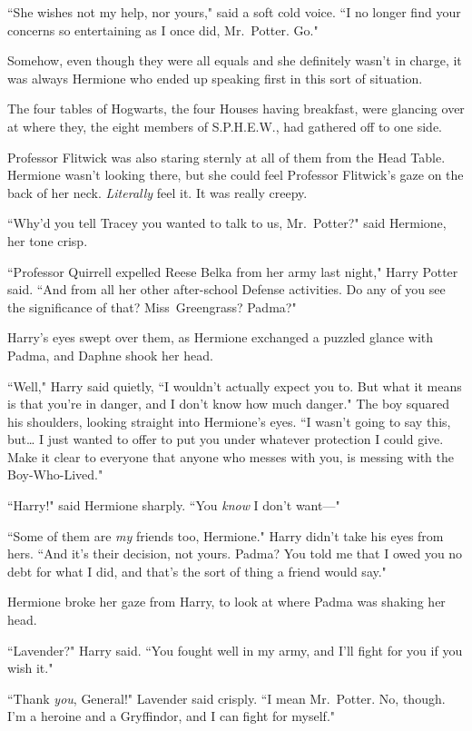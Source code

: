 ``She wishes not my help, nor yours," said a soft cold voice. ``I no longer find your concerns so entertaining as I once did, Mr.~Potter. Go."

\later

Somehow, even though they were all equals and she definitely wasn't in charge, it was always Hermione who ended up speaking first in this sort of situation.

The four tables of Hogwarts, the four Houses having breakfast, were glancing over at where they, the eight members of S.P.H.E.W., had gathered off to one side.

Professor Flitwick was also staring sternly at all of them from the Head Table. Hermione wasn't looking there, but she could feel Professor Flitwick's gaze on the back of her neck. \emph{Literally} feel it. It was really creepy.

``Why'd you tell Tracey you wanted to talk to us, Mr.~Potter?" said Hermione, her tone crisp.

``Professor Quirrell expelled Reese Belka from her army last night," Harry Potter said. ``And from all her other after-school Defense activities. Do any of you see the significance of that? Miss~Greengrass? Padma?"

Harry's eyes swept over them, as Hermione exchanged a puzzled glance with Padma, and Daphne shook her head.

``Well," Harry said quietly, ``I wouldn't actually expect you to. But what it means is that you're in danger, and I don't know how much danger." The boy squared his shoulders, looking straight into Hermione's eyes. ``I wasn't going to say this, but{\ldots} I just wanted to offer to put you under whatever protection I could give. Make it clear to everyone that anyone who messes with you, is messing with the Boy-Who-Lived."

``Harry!" said Hermione sharply. ``You \emph{know} I don't want—"

``Some of them are \emph{my} friends too, Hermione." Harry didn't take his eyes from hers. ``And it's their decision, not yours. Padma? You told me that I owed you no debt for what I did, and that's the sort of thing a friend would say."

Hermione broke her gaze from Harry, to look at where Padma was shaking her head.

``Lavender?" Harry said. ``You fought well in my army, and I'll fight for you if you wish it."

``Thank \emph{you}, General!" Lavender said crisply. ``I mean Mr.~Potter. No, though. I'm a heroine and a Gryffindor, and I can fight for myself."

